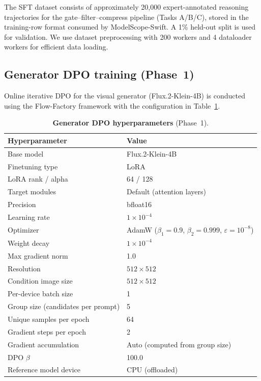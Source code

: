 The SFT dataset consists of approximately 20{,}000 expert-annotated reasoning trajectories for the gate--filter--compress pipeline (Tasks A/B/C), stored in the training-row format consumed by ModelScope-Swift.
A 1\% held-out split is used for validation.
We use dataset preprocessing with 200 workers and 4 dataloader workers for efficient data loading.

\subsection{Generator DPO training (Phase~1)}
Online iterative DPO for the visual generator (Flux.2-Klein-4B) is conducted using the Flow-Factory framework with the configuration in Table~\ref{tab:app_dpo}.

\begin{table}[t]
  \centering
  \caption{\textbf{Generator DPO hyperparameters} (Phase~1).}
  \label{tab:app_dpo}
  \small
  \begin{tabularx}{\linewidth}{lX}
    \toprule
    \textbf{Hyperparameter} & \textbf{Value} \\
    \midrule
    Base model & Flux.2-Klein-4B \\
    Finetuning type & LoRA \\
    LoRA rank / alpha & 64 / 128 \\
    Target modules & Default (attention layers) \\
    Precision & bfloat16 \\
    Learning rate & $1\times 10^{-4}$ \\
    Optimizer & AdamW ($\beta_1{=}0.9$, $\beta_2{=}0.999$, $\varepsilon{=}10^{-8}$) \\
    Weight decay & $1\times 10^{-4}$ \\
    Max gradient norm & 1.0 \\
    Resolution & $512 \times 512$ \\
    Condition image size & $512 \times 512$ \\
    Per-device batch size & 1 \\
    Group size (candidates per prompt) & 5 \\
    Unique samples per epoch & 64 \\
    Gradient steps per epoch & 2 \\
    Gradient accumulation & Auto (computed from group size) \\
    DPO $\beta$ & 100.0 \\
    Reference model device & CPU (offloaded) \\

\end{tabularx}
\end{table}
